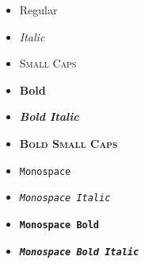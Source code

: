 \begin{frame}[fragile]{}

	\begin{itemize}
		\item Regular
		\item \textit{Italic}
		\item \textsc{Small Caps}
		\item \textbf{Bold}
		\item \textbf{\textit{Bold Italic}}
		\item \textbf{\textsc{Bold Small Caps}}
		\item \texttt{Monospace}
		\item \texttt{\textit{Monospace Italic}}
		\item \texttt{\textbf{Monospace Bold}}
		\item \texttt{\textbf{\textit{Monospace Bold Italic}}}
	\end{itemize}

\end{frame}